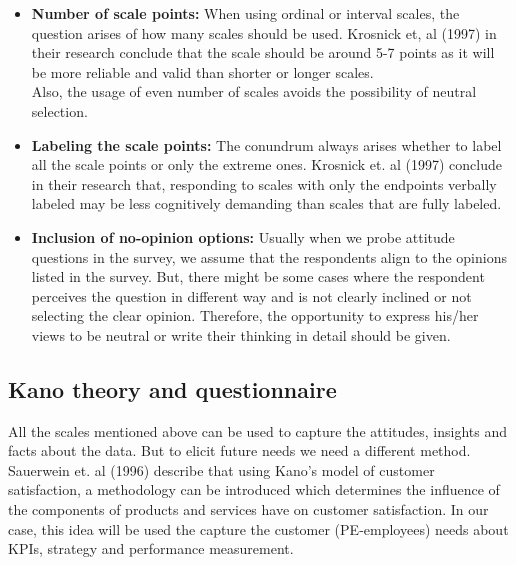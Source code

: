 \begin{itemize}

\item \textbf{Number of scale points:} When using ordinal or interval scales, the question arises of how many scales should be used. Krosnick et, al (1997) in their research conclude that the scale should be around 5-7 points as it will be more reliable and valid than shorter or longer scales.\\
Also, the usage of even number of scales avoids the possibility of neutral selection.\\

\item \textbf{Labeling the scale points:} The conundrum always arises whether to label all the scale points or only the extreme ones. Krosnick et. al (1997) conclude in their research that, responding to scales with only the endpoints verbally labeled may be less cognitively demanding than scales that are fully labeled. \\

\item \textbf{Inclusion of no-opinion options:} Usually when we probe attitude questions in the survey, we assume that the respondents align to the opinions listed in the survey. But, there might be some cases where the respondent perceives the question in different way and is not clearly inclined or not selecting the clear opinion. Therefore, the opportunity to express his/her views to be neutral or write their thinking in detail should be given.\\
\end{itemize}

\subsection{Kano theory and questionnaire}
All the scales mentioned above can be used to capture the attitudes, insights and facts about the data. But to elicit future needs we need a different method. Sauerwein et. al (1996) describe that using Kano’s model of customer satisfaction,  a methodology can be introduced which determines the influence of the components of products and services have on customer satisfaction. In our case, this idea will be used the capture the customer (PE-employees) needs about KPIs, strategy and performance measurement.\\

